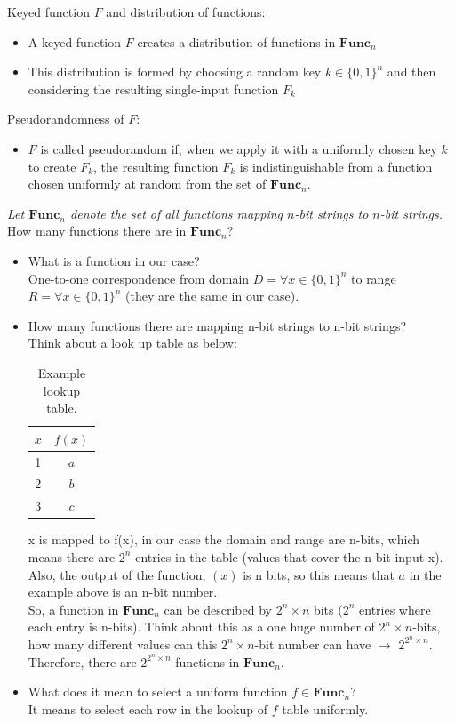 \documentclass[12pt]{article}
\begin{document}
Keyed function $F$ and distribution of functions:
\begin{itemize}
\item A keyed function $F$ creates a distribution of functions in $\textbf{Func}_n$
\item This distribution is formed by choosing a random key $k \in \{0,1\}^n$ and then considering the resulting single-input function $F_k$
\end{itemize}

Pseudorandomness of $F$:
\begin{itemize}
\item $F$ is called pseudorandom if, when we apply it with a uniformly chosen key $k$ to create $F_k$, the resulting function $F_k$ is indistinguishable from a function chosen uniformly at random from the set of $\textbf{Func}_n$.
\end{itemize}

\newpage
\emph{Let $\textbf{Func}_n$ denote the set of all functions mapping $n$-bit strings to $n$-bit strings.}\\ 
How many functions there are in $\textbf{Func}_n$?
\begin{itemize}
\item What is a function in our case?\\
One-to-one correspondence from domain $D = \forall x \in \{0,1\}^n$ to range  $R = \forall x \in \{0,1\}^n$ (they are the same in our case).
\item How many functions there are mapping n-bit strings to n-bit strings?\\
Think about a look up table as below:
\begin{table}[h]
  \centering
  \begin{tabular}{|c|c|}
    \hline
    $x$ & $f(x)$ \\
    \hline
    1 & $a$ \\
    2 & $b$ \\
    3 & $c$ \\
    \hline
  \end{tabular}
  \caption{Example lookup table.}
  \label{tab:your_table_label}
\end{table}
x is mapped to f(x), in our case the domain and range are n-bits, which means there are $2^n$ entries in the table (values that cover the n-bit input x). Also, the output of the function, $(x)$ is n bits, so this means that $a$ in the example above is an n-bit number. \\
So, a function in  $\textbf{Func}_n$ can be described by $2^n\times n$ bits ($2^n$ entries where each entry is n-bits). Think about this as a one huge number of $2^n\times n$-bits, how many different values can this $2^n\times n$-bit number can have $\rightarrow$ $2^{2^n\times n}$. Therefore, there are $2^{2^n\times n}$ functions in $\textbf{Func}_n$.
\item What does it mean to select a uniform function $f \in \textbf{Func}_n$?\\
It means to select each row in the lookup of $f$ table uniformly.
\end{itemize}
\end{document}
